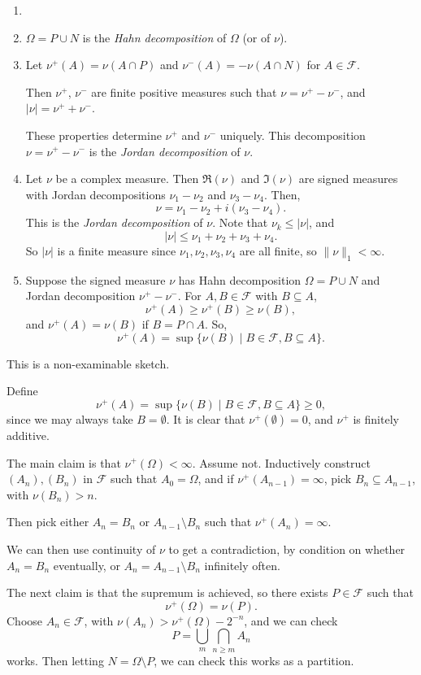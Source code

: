 \documentclass[12pt]{article}
\begin{document}
\begin{remark}
	\begin{enumerate}
		\item[]
		\item $\Omega = P \cup N$ is the \emph{Hahn decomposition} of $\Omega$ (or of $\nu$).
		\item Let $\nu^+(A) = \nu(A \cap P)$ and $\nu^-(A) = - \nu(A \cap N)$ for $A \in \mathcal{F}$.

			Then $\nu^+$, $\nu^-$ are finite positive measures such that $\nu = \nu^+ - \nu^-$, and $|\nu| = \nu^+ + \nu^-$.

			These properties determine $\nu^+$ and $\nu^-$ uniquely. This decomposition $\nu = \nu^+ - \nu^-$ is the \emph{Jordan decomposition} of $\nu$.
		\item Let $\nu$ be a complex measure. Then $\Re (\nu)$ and $\Im(\nu)$ are signed measures with Jordan decompositions $\nu_1 - \nu_2$ and $\nu_3 - \nu_4$. Then,
			\[
			\nu = \nu_1 - \nu_2 + i(\nu_3 - \nu_4).
			\]
			This is the \emph{Jordan decomposition} of $\nu$. Note that $\nu_k \leq |\nu|$, and
			\[
			|\nu| \leq \nu_1 + \nu_2 + \nu_3 + \nu_4.
			\]
			So $|\nu|$ is a finite measure since $\nu_1, \nu_2, \nu_3, \nu_4$ are all finite, so $\|\nu\|_1 < \infty$.
		\item Suppose the signed measure $\nu$ has Hahn decomposition $\Omega = P \cup N$ and Jordan decomposition $\nu^+ - \nu^-$. For $A, B \in \mathcal{F}$ with $B \subseteq A$,
			\[
			\nu^+(A) \geq \nu^+(B) \geq \nu(B),
			\]
			and $\nu^+(A) = \nu(B)$ if $B = P \cap A$. So,
			\[
				\nu^+(A) = \sup \{ \nu(B) \mid B \in \mathcal{F}, B \subseteq A\}.
			\]
	\end{enumerate}
\end{remark}

\begin{proofbox}
	This is a non-examinable sketch.

	Define
	\[
		\nu^+(A) = \sup \{\nu(B) \mid B \in \mathcal{F}, B \subseteq A\} \geq 0,
	\]
	since we may always take $B = \emptyset$. It is clear that $\nu^+(\emptyset) = 0$, and $\nu^+$ is finitely additive.

	The main claim is that $\nu^+(\Omega) < \infty$. Assume not. Inductively construct $(A_n), (B_n)$ in $\mathcal{F}$ such that $A_0 = \Omega$, and if $\nu^+(A_{n-1}) = \infty$, pick $B_n \subseteq A_{n-1}$, with $\nu(B_n) > n$.

	Then pick either $A_n = B_n$ or $A_{n-1} \setminus B_n$ such that $\nu^+(A_n) = \infty$.

	We can then use continuity of $\nu$ to get a contradiction, by condition on whether $A_n = B_n$ eventually, or $A_n = A_{n-1} \setminus B_n$ infinitely often.

	The next claim is that the supremum is achieved, so there exists $P \in \mathcal{F}$ such that
	\[
		\nu^+(\Omega) = \nu(P).
	\]
	Choose $A_n \in \mathcal{F}$, with $\nu(A_n) > \nu^+(\Omega) - 2^{-n}$, and we can check
	\[
	P = \bigcup_m \bigcap_{n \geq m} A_n
	\]
	works. Then letting $N = \Omega \setminus P$, we can check this works as a partition.
\end{proofbox}



\newpage

\printindex
\end{document}
